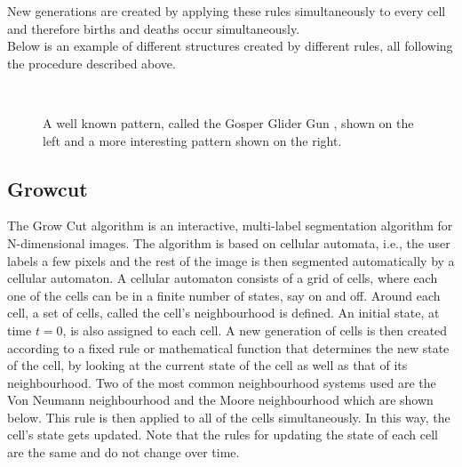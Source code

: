 \documentclass[a4paper,10pt]{article}
\begin{document}
New generations are created by applying these rules simultaneously to every cell and therefore births and deaths occur simultaneously. \\

Below is an example of different structures created by different rules, all following the procedure described above.

\begin{figure}[H]
\centering
\mbox{ \quad
{}} \caption{A well known pattern, called the Gosper Glider Gun \cite{n}, shown on the left and a more interesting pattern \cite{p} shown on the right.}
\end{figure}

\subsection{Growcut}
\label{growcut}
The Grow Cut algorithm is an interactive, multi-label segmentation algorithm
for N-dimensional images.  The algorithm is based on cellular automata, i.e.,
the user labels a few pixels and the rest of the image is then segmented
automatically by a cellular automaton.  A cellular automaton consists of a
grid of cells, where each one of the cells can be in a finite number of
states, say on and off.   Around each cell, a set of cells, called the cell's
neighbourhood is defined.  An initial state, at time $t = 0$, is also assigned
to each cell.
A new generation of cells is then created according to a fixed rule or
mathematical function that determines the new state of the cell, by looking at
the current state of the cell as well
as that of its neighbourhood.  Two of the most common neighbourhood systems used are the Von
Neumann neighbourhood and the Moore neighbourhood which are shown below.
This rule
is then applied to all of the cells simultaneously.  In this way, the cell's
state gets updated.  Note that the rules for updating the state of each cell are
the same and do not
change over time. \\
\end{document}
